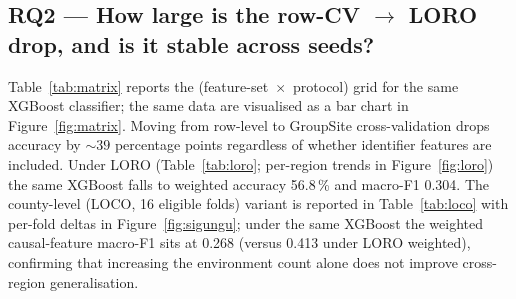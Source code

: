 \documentclass[3p,times,authoryear]{elsarticle}
\theoremstyle{remark}
\begin{document}
\subsection{RQ2 --- How large is the row-CV $\rightarrow$ LORO drop, and is it stable across seeds?}\label{sec:res-rq2}

Table~\ref{tab:matrix} reports the
(feature-set~$\times$~protocol) grid for the same XGBoost
classifier; the same data are visualised as a bar chart in
Figure~\ref{fig:matrix}. Moving from row-level to GroupSite
cross-validation drops accuracy by $\sim 39$ percentage points
regardless of whether identifier features are included. Under
LORO (Table~\ref{tab:loro}; per-region trends in
Figure~\ref{fig:loro}) the same XGBoost falls to weighted
accuracy 56.8\,\% and macro-F1 0.304. The county-level (LOCO,
16 eligible folds) variant is reported in Table~\ref{tab:loco}
with per-fold deltas in Figure~\ref{fig:sigungu}; under the
same XGBoost the weighted causal-feature macro-F1 sits at
0.268 (versus 0.413 under LORO weighted), confirming that
increasing the environment count alone does not improve
cross-region generalisation.

\begin{table}[!htbp]
\caption{Evaluation-protocol sensitivity (causal XGBoost,
canonical seed). Row-CV $\rightarrow$ GroupSite drops accuracy
by $\sim 39$~pp. Multi-seed standard deviations are reported
in parentheses.\label{tab:matrix}}
\centering
\scriptsize
\setlength{\tabcolsep}{3pt}
\end{table}
\end{document}
